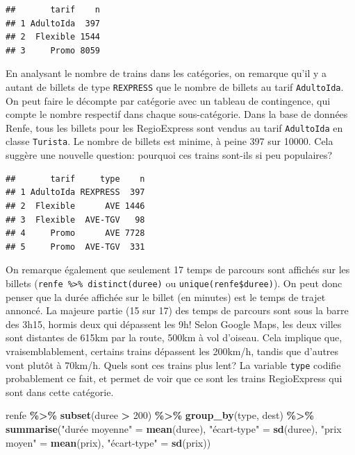 \documentclass[
  11pt,
  letterpaper,
]{article}
\newenvironment{Shaded}{\begin{snugshade}}{\end{snugshade}}
\newcommand{\DecValTok}[1]{\textcolor[rgb]{0.00,0.00,0.81}{#1}}
\newcommand{\KeywordTok}[1]{\textcolor[rgb]{0.13,0.29,0.53}{\textbf{#1}}}
\newcommand{\NormalTok}[1]{#1}
\newcommand{\OperatorTok}[1]{\textcolor[rgb]{0.81,0.36,0.00}{\textbf{#1}}}
\newcommand{\StringTok}[1]{\textcolor[rgb]{0.31,0.60,0.02}{#1}}
\theoremstyle{definition}
\theoremstyle{definition}
\theoremstyle{definition}
\theoremstyle{remark}
\begin{document}
\begin{verbatim}
##       tarif    n
## 1 AdultoIda  397
## 2  Flexible 1544
## 3     Promo 8059
\end{verbatim}

En analysant le nombre de trains dans les catégories, on remarque qu'il y a autant de billets de type \texttt{REXPRESS} que le nombre de billets au tarif \texttt{AdultoIda}. On peut faire le décompte par catégorie avec un tableau de contingence, qui compte le nombre respectif dans chaque sous-catégorie. Dans la base de données Renfe, tous les billets pour les RegioExpress sont vendus au tarif \texttt{AdultoIda} en classe \texttt{Turista}. Le nombre de billets est minime, à peine 397 sur 10000. Cela suggère une nouvelle question: pourquoi ces trains sont-ils si peu populaires?

\begin{verbatim}
##       tarif     type    n
## 1 AdultoIda REXPRESS  397
## 2  Flexible      AVE 1446
## 3  Flexible  AVE-TGV   98
## 4     Promo      AVE 7728
## 5     Promo  AVE-TGV  331
\end{verbatim}

On remarque également que seulement 17 temps de parcours sont affichés sur les billets (\texttt{renfe\ \%\textgreater{}\%\ distinct(duree)} ou \texttt{unique(renfe\$duree)}). On peut donc penser que la durée affichée sur le billet (en minutes) est le temps de trajet annoncé. La majeure partie (15 sur 17) des temps de parcours sont sous la barre des 3h15, hormis deux qui dépassent les 9h! Selon Google Maps, les deux villes sont distantes de 615km par la route, 500km à vol d'oiseau. Cela implique que, vraisemblablement, certains trains dépassent les 200km/h, tandis que d'autres vont plutôt à 70km/h. Quels sont ces trains plus lent? La variable \texttt{type} codifie probablement ce fait, et permet de voir que ce sont les trains RegioExpress qui sont dans cette catégorie.

\begin{Shaded}
\begin{Highlighting}[]
\NormalTok{renfe }\OperatorTok{\%\textgreater{}\%}\StringTok{ }
\StringTok{  }\KeywordTok{subset}\NormalTok{(duree }\OperatorTok{\textgreater{}}\StringTok{ }\DecValTok{200}\NormalTok{) }\OperatorTok{\%\textgreater{}\%}\StringTok{ }
\StringTok{  }\KeywordTok{group\_by}\NormalTok{(type, dest) }\OperatorTok{\%\textgreater{}\%}\StringTok{ }
\StringTok{  }\KeywordTok{summarise}\NormalTok{(}\StringTok{"durée moyenne"}\NormalTok{ =}\StringTok{ }\KeywordTok{mean}\NormalTok{(duree), }
            \StringTok{"écart{-}type"}\NormalTok{ =}\StringTok{ }\KeywordTok{sd}\NormalTok{(duree),}
            \StringTok{"prix moyen"}\NormalTok{ =}\StringTok{ }\KeywordTok{mean}\NormalTok{(prix), }
            \StringTok{"écart{-}type"}\NormalTok{ =}\StringTok{ }\KeywordTok{sd}\NormalTok{(prix)) }
\end{Highlighting}
\end{Shaded}
\end{document}
